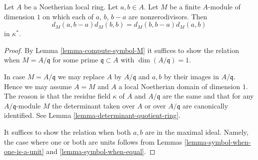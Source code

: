 \begin{lemma}
\label{lemma-symbol-is-steinberg-prepare}
Let $A$ be a Noetherian local ring.
Let $a, b \in A$.
Let $M$ be a finite $A$-module of dimension $1$ on
which each of $a$, $b$, $b - a$ are nonzerodivisors.
Then
$$
d_M(a, b - a)d_M(b, b) = d_M(b, b - a)d_M(a, b)
$$
in $\kappa^*$.
\end{lemma}

\begin{proof}
By Lemma \ref{lemma-compute-symbol-M} it suffices to show the relation when
$M = A/\mathfrak q$ for some prime $\mathfrak q \subset A$ with
$\dim(A/\mathfrak q) = 1$.

\medskip\noindent
In case $M = A/\mathfrak q$ we may replace $A$ by $A/\mathfrak q$ and
$a, b$ by their images in $A/\mathfrak q$. Hence we may assume $A = M$
and $A$ a local Noetherian domain of dimension $1$. The reason is
that the residue field $\kappa$ of $A$ and $A/\mathfrak q$ are
the same and that for any $A/\mathfrak q$-module $M$ the determinant
taken over $A$ or over $A/\mathfrak q$ are canonically identified.
See Lemma \ref{lemma-determinant-quotient-ring}.

\medskip\noindent
It suffices to show the relation when both
$a, b$ are in the maximal ideal. Namely, the case where one
or both are units follows from Lemmas \ref{lemma-symbol-when-one-is-a-unit}
and \ref{lemma-symbol-when-equal}.


\end{proof}
